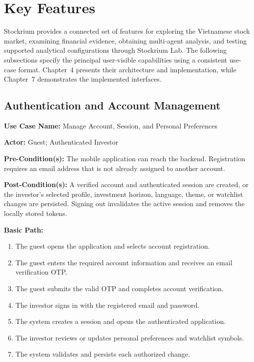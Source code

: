 \section{Key Features}
\label{sec:key-features}

Stockrium provides a connected set of features for exploring the Vietnamese stock market, examining financial evidence, obtaining multi-agent analysis, and testing supported analytical configurations through Stockrium Lab. The following subsections specify the principal user-visible capabilities using a consistent use-case format. Chapter~4 presents their architecture and implementation, while Chapter~7 demonstrates the implemented interfaces.

\subsection{Authentication and Account Management}
\label{subsec:authentication-account-management}

\noindent\textbf{Use Case Name:} Manage Account, Session, and Personal Preferences

\noindent\textbf{Actor:} Guest; Authenticated Investor

\noindent\textbf{Pre-Condition(s):} The mobile application can reach the backend. Registration requires an email address that is not already assigned to another account.

\noindent\textbf{Post-Condition(s):} A verified account and authenticated session are created, or the investor's selected profile, investment horizon, language, theme, or watchlist changes are persisted. Signing out invalidates the active session and removes the locally stored tokens.

\noindent\textbf{Basic Path:}
\begin{enumerate}[leftmargin=*, nosep]
    \item The guest opens the application and selects account registration.
    \item The guest enters the required account information and receives an email verification OTP.
    \item The guest submits the valid OTP and completes account verification.
    \item The investor signs in with the registered email and password.
    \item The system creates a session and opens the authenticated application.
    \item The investor reviews or updates personal preferences and watchlist symbols.
    \item The system validates and persists each authorized change.
\end{enumerate}

